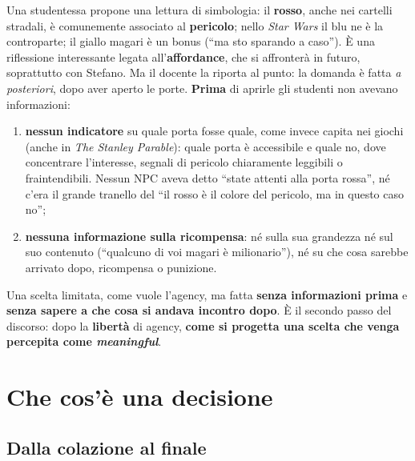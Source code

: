 Una studentessa propone una lettura di simbologia: il \textbf{rosso}, anche
nei cartelli stradali, è comunemente associato al \textbf{pericolo}; nello
\emph{Star Wars} il blu ne è la controparte; il giallo magari è un bonus
(``ma sto sparando a caso''). È una riflessione interessante legata
all'\textbf{affordance}, che si affronterà in futuro, soprattutto con
Stefano. Ma il docente la riporta al punto: la domanda è fatta \emph{a
posteriori}, dopo aver aperto le porte. \textbf{Prima} di aprirle gli
studenti non avevano informazioni:
\begin{enumerate}
  \item \textbf{nessun indicatore} su quale porta fosse quale, come invece
        capita nei giochi (anche in \emph{The Stanley Parable}): quale porta
        è accessibile e quale no, dove concentrare l'interesse, segnali di
        pericolo chiaramente leggibili o fraintendibili. Nessun NPC aveva
        detto ``state attenti alla porta rossa'', né c'era il grande tranello
        del ``il rosso è il colore del pericolo, ma in questo caso no'';
  \item \textbf{nessuna informazione sulla ricompensa}: né sulla sua
        grandezza né sul suo contenuto (``qualcuno di voi magari è
        milionario''), né su che cosa sarebbe arrivato dopo, ricompensa o
        punizione.
\end{enumerate}
Una scelta limitata, come vuole l'agency, ma fatta \textbf{senza
informazioni prima} e \textbf{senza sapere a che cosa si andava incontro
dopo}. È il secondo passo del discorso: dopo la \textbf{libertà} di agency,
\textbf{come si progetta una scelta che venga percepita come
\emph{meaningful}}.

\section{Che cos'è una decisione}
\label{gd15:sec:cos-e}

\subsection{Dalla colazione al finale}

